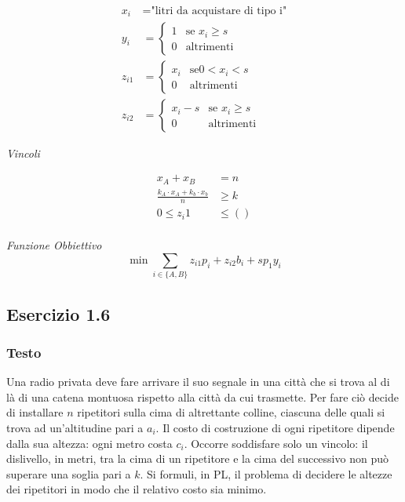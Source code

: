 \[
\begin{aligned}
    x_i &= \text{"litri da acquistare di tipo i"}    \\
    y_i &=\begin{cases}
        1 & \text{se }x_i\geq s\\
        0 & \text{altrimenti}
    \end{cases}\\
    z_{i1} &= \begin{cases}
        x_i &\text{se} 0<x_i<s\\
        0 &\text{altrimenti}
    \end{cases}\\
    z_{i2} &= \begin{cases}
        x_i - s &\text{se } x_i \geq s\\
        0 &\text{altrimenti}
    \end{cases}
    \end{aligned}
\]

\textit{Vincoli}

\[
    \begin{aligned}
        x_A + x_B &= n\\
        \frac{k_A \cdot x_A + k_b \cdot x_b}{n} &\geq k\\
        0 \leq z_i1 &\leq ()\\
    \end{aligned}
\]

\textit{Funzione Obbiettivo}
\[
    \min \sum_{i\in \{A,B\}} z_{i1}p_i + z_{i2}b_i + s p_1 y_i
\]

\subsection{Esercizio 1.6}
\subsubsection{Testo}
Una radio privata deve fare arrivare il suo segnale in una città che si trova al di là di una catena montuosa rispetto alla città da cui trasmette. Per fare ciò decide di installare \( n \) ripetitori sulla cima di altrettante colline, ciascuna delle quali si trova ad un'altitudine pari a \( a_i \). Il costo di costruzione di ogni ripetitore dipende dalla sua altezza: ogni metro costa \( c_i \). Occorre soddisfare solo un vincolo: il dislivello, in metri, tra la cima di un ripetitore e la cima del successivo non può superare una soglia pari a \( k \). Si formuli, in PL, il problema di decidere le altezze dei ripetitori in modo che il relativo costo sia minimo.

